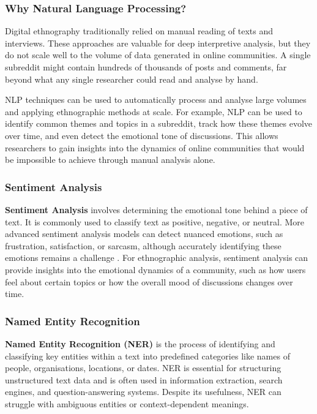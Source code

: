 \documentclass[12pt, a4paper]{article}
\begin{document}
\subsubsection{Why Natural Language Processing?}
Digital ethnography traditionally relied on manual reading of texts and interviews. These approaches are valuable for deep interpretive analysis, but they do not scale well to the volume of data generated in online communities. A single subreddit might contain hundreds of thousands of posts and comments, far beyond what any single researcher could read and analyse by hand.

NLP techniques can be used to automatically process and analyse large volumes and applying ethnographic methods at scale. For example, NLP can be used to identify common themes and topics in a subreddit, track how these themes evolve over time, and even detect the emotional tone of discussions. This allows researchers to gain insights into the dynamics of online communities that would be impossible to achieve through manual analysis alone.

\subsubsection{Sentiment Analysis}
\textbf{Sentiment Analysis} involves determining the emotional tone behind a piece of text. It is commonly used to classify text as positive, negative, or neutral. More advanced sentiment analysis models can detect nuanced emotions, such as frustration, satisfaction, or sarcasm, although accurately identifying these emotions remains a challenge \cite{giuffre2026sentiment}. For ethnographic analysis, sentiment analysis can provide insights into the emotional dynamics of a community, such as how users feel about certain topics or how the overall mood of discussions changes over time.

\subsubsection{Named Entity Recognition}
\textbf{Named Entity Recognition (NER)} is the process of identifying and classifying key entities within a text into predefined categories like names of people, organisations, locations, or dates. NER is essential for structuring unstructured text data and is often used in information extraction, search engines, and question-answering systems. Despite its usefulness, NER can struggle with ambiguous entities or context-dependent meanings.
\end{document}
